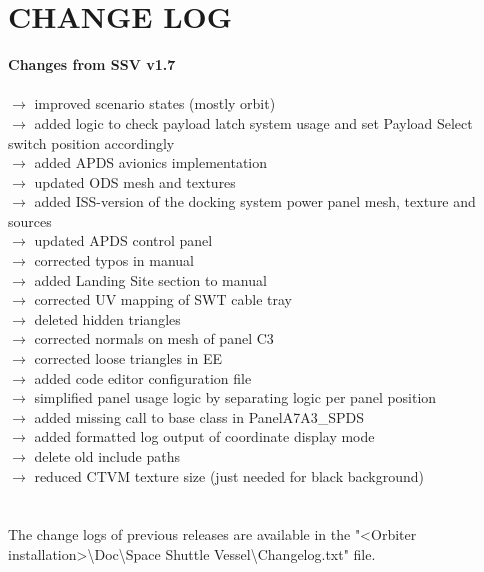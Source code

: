 \documentclass[Space_Shuttle_Vessel_Manual.tex]{subfiles}
\begin{document}
\section{CHANGE LOG}
\label{sec:change-log}
\noindent
\textbf{Changes from SSV v1.7}\\\\
$\rightarrow$ improved scenario states (mostly orbit)\\
$\rightarrow$ added logic to check payload latch system usage and set Payload Select switch position accordingly\\
$\rightarrow$ added APDS avionics implementation\\
$\rightarrow$ updated ODS mesh and textures\\
$\rightarrow$ added ISS-version of the docking system power panel mesh, texture and sources\\
$\rightarrow$ updated APDS control panel\\
$\rightarrow$ corrected typos in manual\\
$\rightarrow$ added Landing Site section to manual\\
$\rightarrow$ corrected UV mapping of SWT cable tray\\
$\rightarrow$ deleted hidden triangles\\
$\rightarrow$ corrected normals on mesh of panel C3\\
$\rightarrow$ corrected loose triangles in EE\\
$\rightarrow$ added code editor configuration file\\
$\rightarrow$ simplified panel usage logic by separating logic per panel position\\
$\rightarrow$ added missing call to base class in PanelA7A3\_SPDS\\
$\rightarrow$ added formatted log output of coordinate display mode\\
$\rightarrow$ delete old include paths\\
$\rightarrow$ reduced CTVM texture size (just needed for black background)\\
\\
\\
The change logs of previous releases are available in the "<Orbiter installation>\textbackslash Doc\textbackslash Space Shuttle Vessel\textbackslash Changelog.txt" file.
\end{document}
